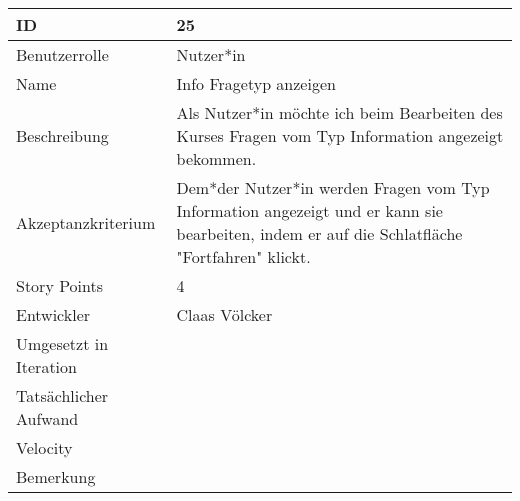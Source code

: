 \begin{tabularx}{\textwidth}{|p{}|X|}
	\hline
	ID & 25\\
	\hline
	Benutzerrolle & Nutzer*in\\
	\hline
	Name & Info Fragetyp anzeigen\\
	\hline
	Beschreibung & Als Nutzer*in möchte ich beim Bearbeiten des Kurses Fragen vom Typ Information angezeigt bekommen.\\
	\hline
	Akzeptanzkriterium & Dem*der Nutzer*in werden Fragen vom Typ Information angezeigt und er kann sie bearbeiten, indem er auf die Schlatfläche "Fortfahren" klickt.\\
	\hline
	Story Points & 4 \\
	\hline
	Entwickler & Claas Völcker \\
	\hline
	Umgesetzt in Iteration & \\
	\hline
	Tatsächlicher Aufwand & \\
	\hline
	Velocity & \\
	\hline
	Bemerkung & \\
	\hline
\end{tabularx}
\vspace{20pt}
